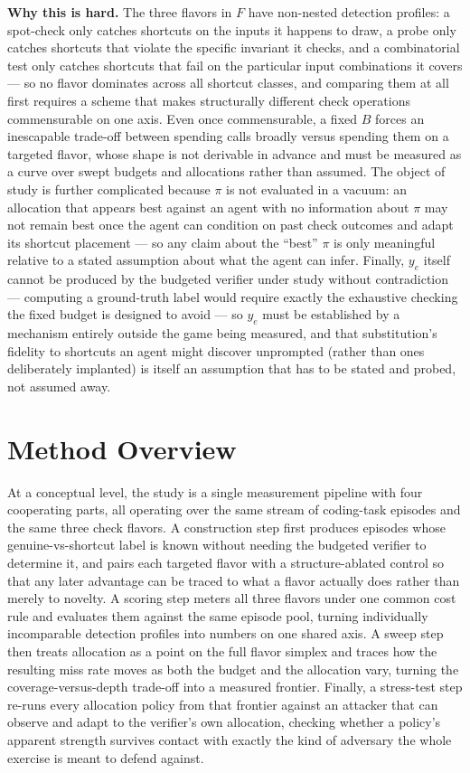 \documentclass[11pt]{article}
\begin{document}
\noindent\textbf{Why this is hard.} The three flavors in $F$ have non-nested detection profiles: a spot-check only catches shortcuts on the inputs it happens to draw, a probe only catches shortcuts that violate the specific invariant it checks, and a combinatorial test only catches shortcuts that fail on the particular input combinations it covers --- so no flavor dominates across all shortcut classes, and comparing them at all first requires a scheme that makes structurally different check operations commensurable on one axis. Even once commensurable, a fixed $B$ forces an inescapable trade-off between spending calls broadly versus spending them on a targeted flavor, whose shape is not derivable in advance and must be measured as a curve over swept budgets and allocations rather than assumed. The object of study is further complicated because $\pi$ is not evaluated in a vacuum: an allocation that appears best against an agent with no information about $\pi$ may not remain best once the agent can condition on past check outcomes and adapt its shortcut placement --- so any claim about the ``best'' $\pi$ is only meaningful relative to a stated assumption about what the agent can infer. Finally, $y_e$ itself cannot be produced by the budgeted verifier under study without contradiction --- computing a ground-truth label would require exactly the exhaustive checking the fixed budget is designed to avoid --- so $y_e$ must be established by a mechanism entirely outside the game being measured, and that substitution's fidelity to shortcuts an agent might discover unprompted (rather than ones deliberately implanted) is itself an assumption that has to be stated and probed, not assumed away.

\section{Method Overview}

At a conceptual level, the study is a single measurement pipeline with four cooperating parts, all operating over the same stream of coding-task episodes and the same three check flavors. A construction step first produces episodes whose genuine-vs-shortcut label is known without needing the budgeted verifier to determine it, and pairs each targeted flavor with a structure-ablated control so that any later advantage can be traced to what a flavor actually does rather than merely to novelty. A scoring step meters all three flavors under one common cost rule and evaluates them against the same episode pool, turning individually incomparable detection profiles into numbers on one shared axis. A sweep step then treats allocation as a point on the full flavor simplex and traces how the resulting miss rate moves as both the budget and the allocation vary, turning the coverage-versus-depth trade-off into a measured frontier. Finally, a stress-test step re-runs every allocation policy from that frontier against an attacker that can observe and adapt to the verifier's own allocation, checking whether a policy's apparent strength survives contact with exactly the kind of adversary the whole exercise is meant to defend against.
\end{document}
